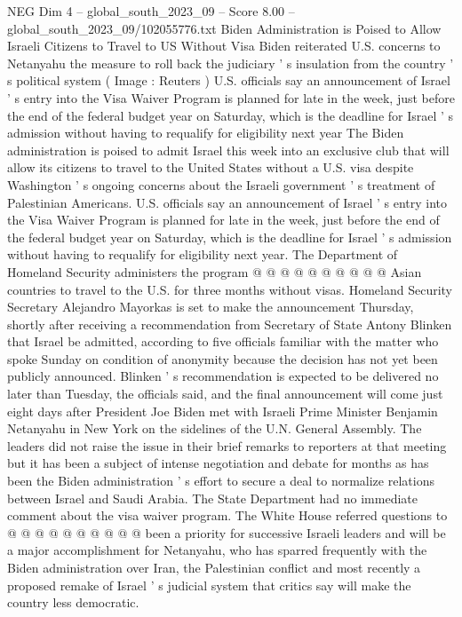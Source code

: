 \begin{textsample}{NEG Dim 4 – global\_south\_2023\_09 – Score 8.00 – global\_south\_2023\_09/102055776.txt}  \label{ex:f4_neg_040}
Biden Administration is Poised to Allow Israeli Citizens to Travel to US Without Visa Biden reiterated U.S. concerns to Netanyahu the measure to roll back the judiciary ' s insulation from the country ' s political system ( Image : Reuters ) U.S. officials say an announcement of Israel ' s entry into the Visa Waiver Program is planned for late in the week, just before the end of the federal budget year on Saturday, which is the deadline for Israel ' s admission without having to requalify for eligibility next year The Biden administration is poised to admit Israel this week into an exclusive club that will allow its citizens to travel to the United States without a U.S. visa despite Washington ' s ongoing concerns about the Israeli government ' s treatment of Palestinian Americans.
U.S. officials say an announcement of Israel ' s entry into the Visa Waiver Program is planned for late in the week, just before the end of the federal budget year on Saturday, which is the deadline for Israel ' s admission without having to requalify for eligibility next year.
The Department of Homeland Security administers the program @ @ @ @ @ @ @ @ @ @ Asian countries to travel to the U.S. for three months without visas.
Homeland Security Secretary Alejandro Mayorkas is set to make the announcement Thursday, shortly after receiving a recommendation from Secretary of State Antony Blinken that Israel be admitted, according to five officials familiar with the matter who spoke Sunday on condition of anonymity because the decision has not yet been publicly announced.
Blinken ' s recommendation is expected to be delivered no later than Tuesday, the officials said, and the final announcement will come just eight days after President Joe Biden met with Israeli Prime Minister Benjamin Netanyahu in New York on the sidelines of the U.N.
General Assembly.
The leaders did not raise the issue in their brief remarks to reporters at that meeting but it has been a subject of intense negotiation and debate for months as has been the Biden administration ' s effort to secure a deal to normalize relations between Israel and Saudi Arabia.
The State Department had no immediate comment about the visa waiver program.
The White House referred questions to @ @ @ @ @ @ @ @ @ @ been a priority for successive Israeli leaders and will be a major accomplishment for Netanyahu, who has sparred frequently with the Biden administration over Iran, the Palestinian conflict and most recently a proposed remake of Israel ' s judicial system that critics say will make the country less democratic.

\end{textsample}
